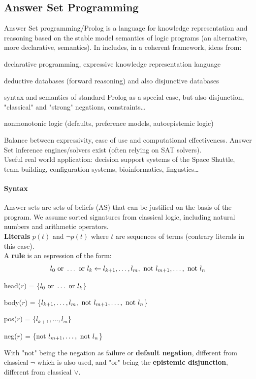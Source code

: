 \documentclass[10pt]{report}
\begin{document}
\subsection{Answer Set Programming}
Answer Set programming/Prolog is a language for knowledge representation and reasoning based on the stable model semantics of logic programs (an alternative, more declarative, semantics). In includes, in a coherent framework, ideas from:
\begin{list}{}{}
	\item declarative programming, expressive knowledge representation language
	\item deductive databases (forward reasoning) and also disjunctive databases
	\item syntax and semantics of standard Prolog as a special case, but also disjunction, "classical" and "strong" negations, constraints\ldots
	\item nonmonotonic logic (defaults, preference models, autoepistemic logic)
\end{list}
Balance between expressivity, ease of use and computational effectiveness. Answer Set inference engines/solvers exist (often relying on SAT solvers).\\
Useful real world application: decision support systems of the Space Shuttle, team building, configuration systems, bioinformatics, lingustics\ldots
\paragraph{Syntax} Answer sets are sets of beliefs (AS) that can be justified on the basis of the program. We assume sorted signatures from classical logic, including natural numbers and arithmetic operators.\\
\textbf{Literals} $p(t)$ and $\neg p(t)$ where $t$ are sequences of terms (contrary literals in this case).\\
A \textbf{rule} is an espression of the form:
$$l_0\hbox{ or }\ldots\hbox{ or }l_k\leftarrow l_{k+1},\ldots,l_m,\hbox{ not }l_{m+1},\ldots,\hbox{ not }l_n$$
\begin{list}{}{}
	\item head($r$) = \{$l_0\hbox{ or }\ldots\hbox{ or }l_k$\}
	\item body($r$) = \{$l_{k+1},\ldots,l_m,\hbox{ not }l_{m+1},\ldots,\hbox{ not }l_n$\}
	\item pos($r$) = \{$l_{k+1},\ldots,l_m$\}
	\item neg($r$) = \{$\hbox{not }l_{m+1},\ldots,\hbox{ not }l_n$\}
\end{list}
With "not" being the negation as failure or \textbf{default negation}, different from classical $\neg$ which is also used, and "or" being the \textbf{epistemic disjunction}, different from classical $\vee$.
\end{document}
